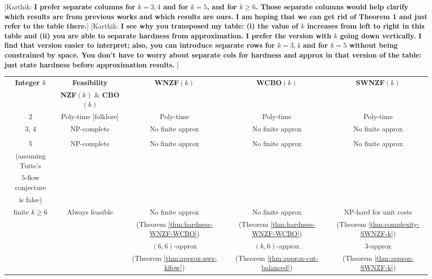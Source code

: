 \documentclass[11pt]{article}
\newcommand{\knote}[1]{{\color{red}[{Karthik: \bf #1}]\marginpar{\color{red}*}}}
\begin{document}
\knote{I prefer separate columns for $k=3, 4$ and for $k=5$, and for $k\ge 6$. Those separate columns would help clarify which results are from previous works and which results are ours. I am hoping that we can get rid of Theorem 1 and just refer to the table there.}
\knote{I see why you transposed my table: (i) the value of $k$ increases from left to right in this table and (ii) you are able to separate hardness from approximation. I prefer the version with $k$ going down vertically. I find that version easier to interpret; also, you can introduce separate rows for $k=3,4$ and for $k=5$ without being constrained by space. You don't have to worry about separate cols for hardness and approx in that version of the table: just state hardness before approximation results. 
}
\fi

\begin{table}[htbp]
\begin{center}
\begin{tabular}{|c|c|c|c|c|}
\hline
\textbf{Integer $k$} & \textbf{Feasibility}& \textbf{WNZF$(k)$} & \textbf{WCBO$(k)$} & \textbf{SWNZF$(k)$}\\
    & \textbf{NZF$(k)$} $\&$ \textbf{CBO$(k)$} & & &  
\\ \hline
2  & Poly-time [folklore] & Poly-time \cite{win1989windy} & Poly-time \cite{win1989windy} & Poly-time \cite{win1989windy} 
\\ \hline
3, 4 & NP-complete & No finite approx & No finite approx & No finite approx \\
& \cite{jaeger1988nowhere, tutte1954contribution, holyer1981np} & & &
\\ \hline
5  & NP-complete & No finite approx & No finite approx & No finite approx \\
(assuming Tutte's & \cite{kochol1998hypothetical}  & & & \\
$5$-flow conjecture & & & &\\ is false) & & & & 
\\ \hline
finite $k\ge 6$ & Always feasible & No finite approx  & No finite approx & NP-hard for unit costs\\
 & \cite{seymour1981nowhere, younger1983integer}  & (Theorem \ref{thm:hardness-WNZF-WCBO}) & (Theorem \ref{thm:hardness-WNZF-WCBO}) & (Theorem \ref{thm:complexity-SWNZF-k}) \\
 & & $(6,6)$-approx & $(k,6)$-approx & $3$-approx \\
 & & (Theorem \ref{thm:approx-nwz-kflow}) & (Theorem \ref{thm:approx-cut-balanced}) & (Theorem \ref{thm:approx-SWNZF-k}) 

\end{tabular}
\end{center}
\end{table}
\end{document}
